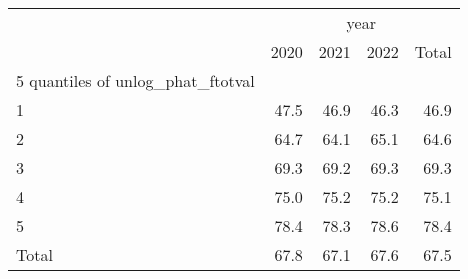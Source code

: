 \begin{tabular}{lllll}
\cline{1-5}
\multicolumn{1}{c}{} &
  \multicolumn{4}{|c}{year} \\
\multicolumn{1}{c}{} &
  \multicolumn{1}{|r}{2020} &
  \multicolumn{1}{r}{2021} &
  \multicolumn{1}{r}{2022} &
  \multicolumn{1}{r}{Total} \\
\cline{1-5}
\multicolumn{1}{l}{5 quantiles of unlog\_phat\_ftotval} &
  \multicolumn{1}{|r}{} &
  \multicolumn{1}{r}{} &
  \multicolumn{1}{r}{} &
  \multicolumn{1}{r}{} \\
\multicolumn{1}{l}{\hspace{1em}1} &
  \multicolumn{1}{|r}{47.5} &
  \multicolumn{1}{r}{46.9} &
  \multicolumn{1}{r}{46.3} &
  \multicolumn{1}{r}{46.9} \\
\multicolumn{1}{l}{\hspace{1em}2} &
  \multicolumn{1}{|r}{64.7} &
  \multicolumn{1}{r}{64.1} &
  \multicolumn{1}{r}{65.1} &
  \multicolumn{1}{r}{64.6} \\
\multicolumn{1}{l}{\hspace{1em}3} &
  \multicolumn{1}{|r}{69.3} &
  \multicolumn{1}{r}{69.2} &
  \multicolumn{1}{r}{69.3} &
  \multicolumn{1}{r}{69.3} \\
\multicolumn{1}{l}{\hspace{1em}4} &
  \multicolumn{1}{|r}{75.0} &
  \multicolumn{1}{r}{75.2} &
  \multicolumn{1}{r}{75.2} &
  \multicolumn{1}{r}{75.1} \\
\multicolumn{1}{l}{\hspace{1em}5} &
  \multicolumn{1}{|r}{78.4} &
  \multicolumn{1}{r}{78.3} &
  \multicolumn{1}{r}{78.6} &
  \multicolumn{1}{r}{78.4} \\
\multicolumn{1}{l}{\hspace{1em}Total} &
  \multicolumn{1}{|r}{67.8} &
  \multicolumn{1}{r}{67.1} &
  \multicolumn{1}{r}{67.6} &
  \multicolumn{1}{r}{67.5} \\
\cline{1-5}
\end{tabular}
